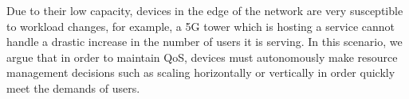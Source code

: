 Due to their low capacity, devices in the edge of the network are very susceptible to workload changes, for example, a 5G tower which is hosting a service cannot handle a drastic increase in the number of users it is serving. In this scenario, we argue that in order to maintain QoS, devices must autonomously make resource management decisions such as scaling horizontally or vertically in order quickly meet the demands of users.











